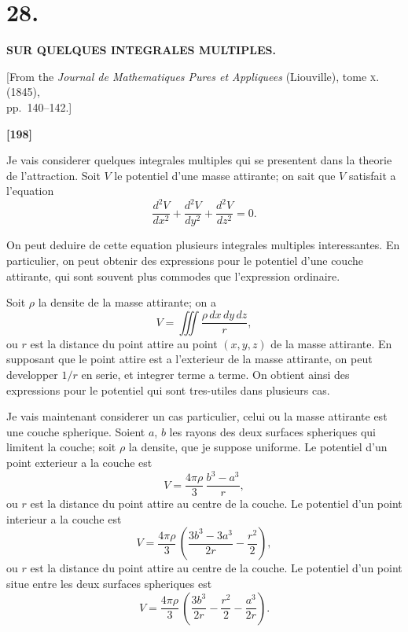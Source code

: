 \documentclass[11pt,a4paper]{book}
\begin{document}
\newpage
\section*{28.}

\begin{center}
\textbf{SUR QUELQUES INTEGRALES MULTIPLES.}
\end{center}

\begin{center}
[From the \textit{Journal de Mathematiques Pures et Appliquees} (Liouville), tome \textsc{x}. (1845),\\
pp.~140--142.]
\end{center}


\textbf{[198]}

Je vais considerer quelques integrales multiples qui se presentent dans la theorie
de l'attraction. Soit $V$ le potentiel d'une masse attirante; on sait que $V$ satisfait a
l'equation
\[\frac{d^2V}{dx^2} + \frac{d^2V}{dy^2} + \frac{d^2V}{dz^2} = 0.\]

On peut deduire de cette equation plusieurs integrales multiples interessantes. En
particulier, on peut obtenir des expressions pour le potentiel d'une couche attirante, qui
sont souvent plus commodes que l'expression ordinaire.

Soit $\rho$ la densite de la masse attirante; on a
\[V = \iiint \frac{\rho\, dx\, dy\, dz}{r},\]
ou $r$ est la distance du point attire au point $(x, y, z)$ de la masse attirante. En supposant
que le point attire est a l'exterieur de la masse attirante, on peut developper $1/r$ en
serie, et integrer terme a terme. On obtient ainsi des expressions pour le potentiel qui
sont tres-utiles dans plusieurs cas.

Je vais maintenant considerer un cas particulier, celui ou la masse attirante est une
couche spherique. Soient $a$, $b$ les rayons des deux surfaces spheriques qui limitent la
couche; soit $\rho$ la densite, que je suppose uniforme. Le potentiel d'un point exterieur a la
couche est
\[V = \frac{4\pi\rho}{3}\, \frac{b^3 - a^3}{r},\]
ou $r$ est la distance du point attire au centre de la couche. Le potentiel d'un point
interieur a la couche est
\[V = \frac{4\pi\rho}{3}\, \left(\frac{3b^3 - 3a^3}{2r} - \frac{r^2}{2}\right),\]
ou $r$ est la distance du point attire au centre de la couche. Le potentiel d'un point situe
entre les deux surfaces spheriques est
\[V = \frac{4\pi\rho}{3}\, \left(\frac{3b^3}{2r} - \frac{r^2}{2} - \frac{a^3}{2r}\right).\]
\end{document}
